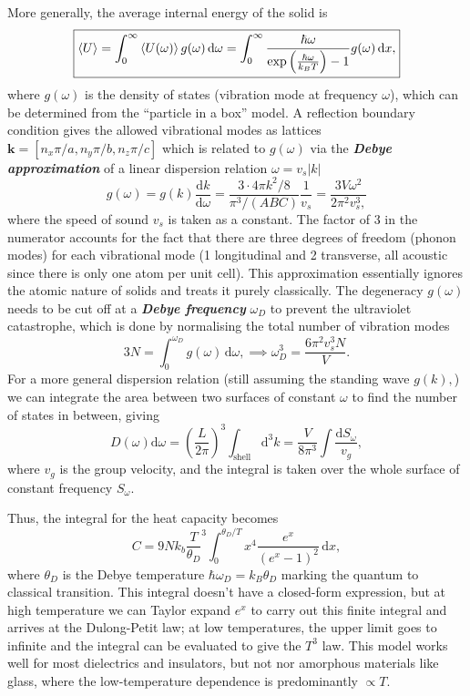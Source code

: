 \documentclass{article}
\theoremstyle{nonumberplain}
\begin{document}
More generally, the average internal energy of the solid is
\begin{equation*}
    \boxed{
        \expval{U} = \int_{0}^{\infty} \expval{U(\omega )}g(\omega ) \,\mathrm{d}\omega = 
        \int_{0}^{\infty} \frac{\hbar \omega }{\exp \left( \frac{\hbar \omega }{k_B T} \right) - 1}g(\omega )  \,\mathrm{d}x , 
    }
\end{equation*}
where $g(\omega )$ is the density of states (vibration mode at frequency $\omega$), which can be determined from the ``particle in a box'' model. A reflection boundary condition gives the allowed vibrational modes as lattices $\mathbf{k} = [n_x \pi / a, n_y \pi / b, n_z \pi /c]$ which is related to $g(\omega)$ via the \textit{\textbf{Debye approximation}} of a linear dispersion relation $\omega = v_s \left\vert k \right\vert$
\[
    g(\omega ) = g(k) \frac{\mathrm{d}k}{\mathrm{d}\omega } = 
    \frac{3 \cdot 4 \pi k^{2} / 8 }{\pi ^3 / (ABC)} \frac{1}{v_s} = 
    \frac{3V \omega ^{2} }{2 \pi  ^{2} v_s^3,}
\]
where the speed of sound $v_s$ is taken as a constant. The factor of $3$ in the numerator accounts for the fact that there are three degrees of freedom (phonon modes) for each vibrational mode (1 longitudinal and 2 transverse, all acoustic since there is only one atom per unit cell). This approximation essentially ignores the atomic nature of solids and treats it purely classically. The degeneracy $g(\omega)$ needs to be cut off at a \textit{\textbf{Debye frequency}} $\omega_D$ to prevent the ultraviolet catastrophe, which is done by normalising the total number of vibration modes
\[
    3N = \int_{0}^{\omega_D} g(\omega ) \,\mathrm{d}\omega , \implies  \omega_D^3 = \frac{6\pi ^{2} v_s^3 N}{V}.  
\] 
For a more general dispersion relation (still assuming the standing wave $g(k),$) we can integrate the area between two surfaces of constant $\omega$ to find the number of states in between, giving
\[
    D(\omega) \mathrm{d} \omega = \left( \frac{L}{2\pi }\right)^3 \int_{\mathrm{shell} } \mathrm{d} ^3 k = \frac{V}{8\pi ^3} \int \frac{\mathrm{d} S_\omega}{v_g},
\]
where $v_g$ is the group velocity, and the integral is taken over the whole surface of constant frequency $S_\omega.$ 

Thus, the integral for the heat capacity becomes 
\[
    C = 9 N k_b \frac{T}{\theta_D}^3 \int_{0}^{\theta_D / T} x^4 \frac{e^x}{(e^x - 1)^{2} } \,\mathrm{d}x,
\]
where $\theta_D$ is the Debye temperature $\hbar \omega_D = k_B \theta_D$ marking the quantum to classical transition. This integral doesn't have a closed-form expression, but at high temperature we can Taylor expand $e^x$ to carry out this finite integral and arrives at the Dulong-Petit law; at low temperatures, the upper limit goes to infinite and the integral can be evaluated to give the $T^3$ law. This model works well for most dielectrics and insulators, but not nor amorphous materials like glass, where the low-temperature dependence is predominantly $\propto T.$
\end{document}
